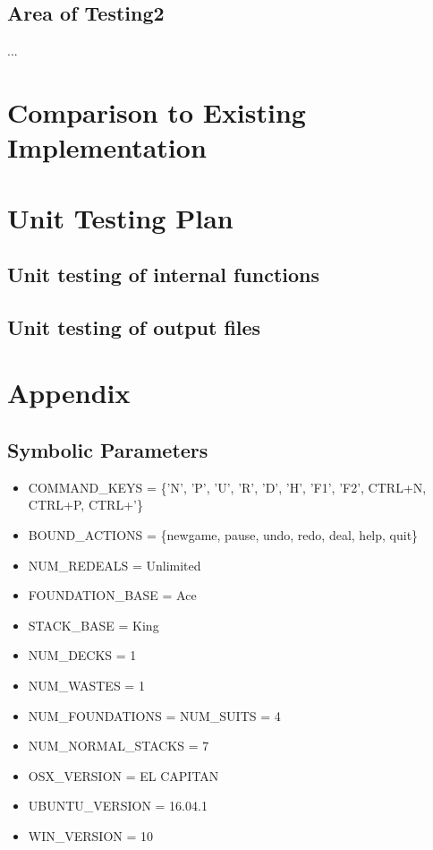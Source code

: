 \documentclass[12pt, titlepage]{article}
\begin{document}
	\subsection{Area of Testing2}
	...
	
	\section{Comparison to Existing Implementation}	
	
	\section{Unit Testing Plan}
	
	\subsection{Unit testing of internal functions}
	
	\subsection{Unit testing of output files}		
	
	
	\newpage
	\section{Appendix}

	\subsection{Symbolic Parameters}
	\begin{itemize}
			\itemsep0em
			\item COMMAND\_KEYS = \{'N', 'P', 'U', 'R', 'D', 'H', \newline 'F1', 'F2', CTRL+N,
			CTRL+P, CTRL+'\}
			\item BOUND\_ACTIONS = \{newgame, pause, undo, redo, deal, help, quit\}
			\item NUM\_REDEALS = Unlimited
			\item FOUNDATION\_BASE = Ace
			\item STACK\_BASE = King
			\item NUM\_DECKS = 1
			\item NUM\_WASTES = 1
			\item NUM\_FOUNDATIONS = NUM\_SUITS = 4
			\item NUM\_NORMAL\_STACKS = 7
			\item OSX_VERSION = EL CAPITAN
			\item UBUNTU_VERSION = 16.04.1
			\item WIN_VERSION = 10
	\end{itemize}
\end{document}
